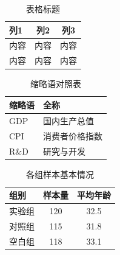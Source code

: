 
\begin{table}[H]
  \centering
  \caption{表格标题}
  \label{tab:xxx}
  \begin{tabular}{lcc}
    \toprule
    \textbf{列1} & \textbf{列2} & \textbf{列3} \\
    \midrule
    内容 & 内容 & 内容 \\
    内容 & 内容 & 内容 \\
    \bottomrule
  \end{tabular}
\end{table}


\begin{table}[H]
  \centering
  \caption{缩略语对照表}
  \label{tab:terminology}
  \begin{tabular}{ll}
    \toprule
    \textbf{缩略语} & \textbf{全称} \\
    \midrule
    GDP  & 国内生产总值 \\
    CPI  & 消费者价格指数 \\
    R\&D & 研究与开发 \\
    \bottomrule
  \end{tabular}
\end{table}

\begin{table}[H]
  \centering
  \caption{各组样本基本情况}
  \label{tab:comparison}
  \begin{tabular}{lcc}
    \toprule
    \textbf{组别} & \textbf{样本量} & \textbf{平均年龄} \\
    \midrule
    实验组 & 120 & 32.5 \\
    对照组 & 115 & 31.8 \\
    空白组 & 118 & 33.1 \\
    \bottomrule
  \end{tabular}
\end{table}

